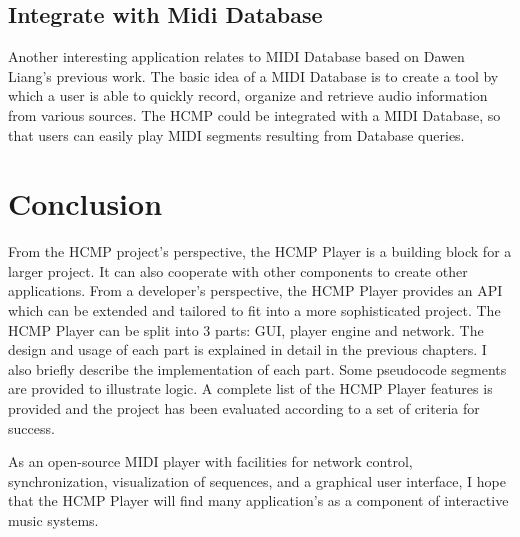 \subsection{Integrate with Midi Database}
Another interesting application relates to MIDI Database \cite{Dawen:ISMIR2011} 
based on Dawen Liang's previous work. The basic idea of a MIDI Database 
is to create a tool by which a user is able to quickly record, organize
and retrieve audio information from various sources. The HCMP could be  
integrated with a MIDI Database, so that users can easily play MIDI 
segments resulting from  Database queries.

\section{Conclusion}
From the HCMP project's perspective, the HCMP Player is a building block for a 
larger project. It can also cooperate with other components to create other
applications. From a developer's perspective, the HCMP Player provides an API
which can be extended and tailored to fit into a more sophisticated project.
The HCMP Player can be split into 3 parts:  
GUI, player engine and network. The design and usage of each part 
is explained in detail in the previous chapters. I also briefly describe 
the implementation of each part. Some pseudocode segments are provided to 
illustrate logic. A complete list of the HCMP Player features is provided 
and the project has been evaluated according to a set of criteria for success. 

As an open-source MIDI player with facilities for network control, 
synchronization, visualization of sequences, and a graphical user interface,
I hope that the HCMP Player will find many application's as a component of 
interactive music systems.
